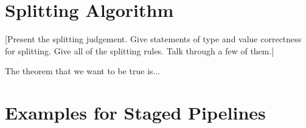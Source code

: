 \documentclass{sigplanconf}
\begin{document}
\section{Splitting Algorithm}

[Present the splitting judgement.  Give statements of type and value correctness for splitting.  Give all of the splitting rules.  Talk through a few of them.]

The theorem that we want to be true is...



\section{Examples for Staged Pipelines}
\end{document}
